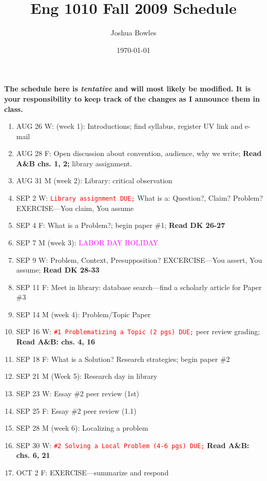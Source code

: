 \documentclass[11pt]{article}
\begin{document}
\author{Joshua Bowles}
\title{Eng 1010 Fall 2009 Schedule}
\date{\today}


\maketitle

{\bf The schedule here is {\it tentative} and will most likely be modified. It is your responsibility to keep track of the changes as I announce them in class.}
   \begin{enumerate}
\item AUG 26 W: (week 1): Introductions; find syllabus, register UV link and e-mail
\item[] AUG 28 F: Open discussion about convention, audience, why we write; \textbf{Read A\&B chs. 1, 2;} library assignment.

\item  AUG 31 M (week 2): Library: critical observation
\item[] SEP 2 W: \textcolor{red}{\texttt{Library assignment DUE;}} What is a: Question?, Claim? Problem? EXERCISE---You claim, You assume 
\item[] SEP 4 F: What is a Problem?; begin paper \#1; {\bf Read DK 26-27} 

\item  SEP 7 M (week 3): \textcolor{magenta}{LABOR DAY HOLIDAY}
\item[] SEP 9 W: Problem, Context, Presupposition? EXCERCISE---You assert, You assume; {\bf Read DK 28-33} 
\item[] SEP 11 F: Meet in library: database search---find a scholarly article for Paper \#3

\item  SEP 14 M (week 4): Problem/Topic Paper
\item[] SEP 16 W: \textcolor{red}{\texttt{\#1 Problematizing a Topic (2 pgs) DUE;}} peer review grading; {\bf Read A\&B: chs. 4, 16}
\item[] SEP 18 F: What is a Solution? Research strategies; begin paper \#2 

\item SEP 21 M (Week 5): Research day in library
\item[] SEP 23 W: Essay \#2 peer review (1st)
\item[] SEP 25 F: Essay \#2 peer review (1.1)

\item SEP 28 M (week 6): Localizing a problem 
\item[] SEP 30 W: \textcolor{red}{\texttt{\#2 Solving a Local Problem (4-6 pgs) DUE;}} {\bf Read A\&B: chs. 6, 21}
\item[] OCT 2 F: EXERCISE---summarize and respond 


\end{enumerate}
\end{document}

